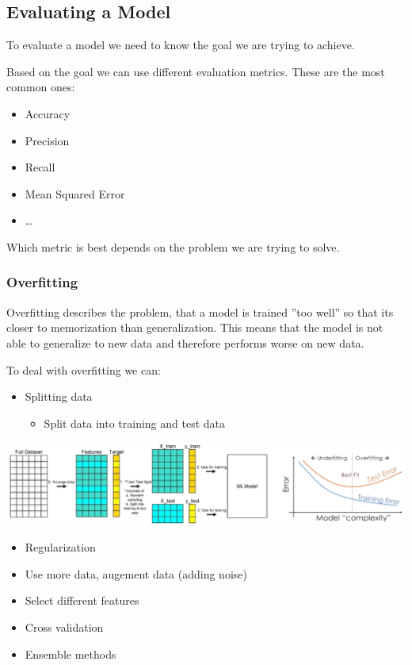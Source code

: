 \documentclass[
../../EiKI_Summary.tex,
]
{subfiles}
\begin{document}
\subsection{Evaluating a Model}
To evaluate a model we need to know the goal we are trying to achieve.

Based on the goal we can use different evaluation metrics. These are the most common ones:
\begin{itemize}
    \item Accuracy
    \item Precision
    \item Recall
    \item Mean Squared Error
    \item \dots
\end{itemize}

Which metric is best depends on the problem we are trying to solve.

\subsubsection{Overfitting}
Overfitting describes the problem, that a model is trained ''too well'' so that its closer to memorization than generalization. This means that the model is not able to generalize to new data and therefore performs worse on new data.

To deal with overfitting we can:
\begin{itemize}
    \item Splitting data
    \begin{itemize}
        \item Split data into training and test data  
    \end{itemize}
\end{itemize}
\includegraphics[width=\textwidth]{Pics/11/SplittingData.png}

\begin{itemize}
    \item Regularization 
    \item Use more data, augement data (adding noise)
    \item Select different features
    \item Cross validation
    \item Ensemble methods
\end{itemize}
\end{document}
